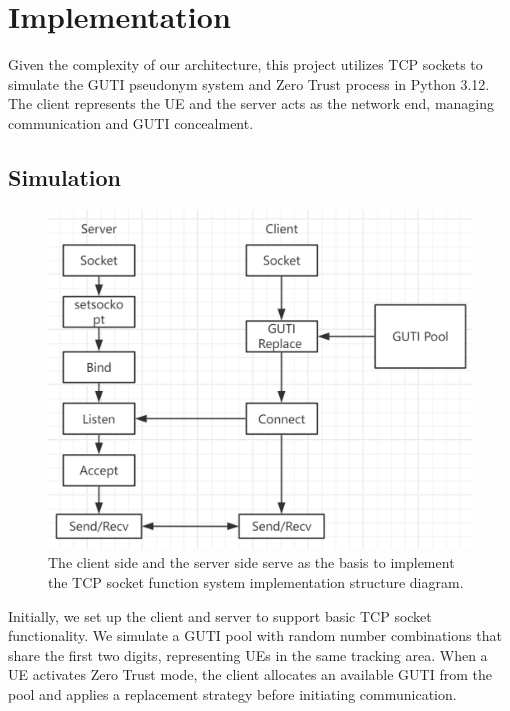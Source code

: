 \documentclass[sigplan,screen]{acmart}
\begin{document}
\section{Implementation}
Given the complexity of our architecture, this project utilizes TCP sockets to simulate the GUTI pseudonym system and Zero Trust process in Python 3.12. The client represents the UE and the server acts as the network end, managing communication and GUTI concealment.

\subsection{Simulation}

\begin{figure}[htbp]
\centering
\includegraphics[width=\linewidth]{implement.png}
\caption{The client side and the server side serve as the basis to implement the TCP socket function system implementation structure diagram.}
\end{figure}

Initially, we set up the client and server to support basic TCP socket functionality. We simulate a GUTI pool with random number combinations that share the first two digits, representing UEs in the same tracking area. When a UE activates Zero Trust mode, the client allocates an available GUTI from the pool and applies a replacement strategy before initiating communication.
\end{document}
